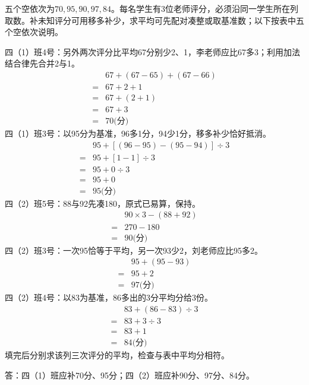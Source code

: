 \begin{BookAnswer}
五个空依次为\(70,95,90,97,84\)。每名学生有3位老师评分，必须沿同一学生所在列取数。补未知评分可用移多补少，求平均可先配对凑整或取基准数；以下按表中五个空依次说明。\par 四（1）班4号：另外两次评分比平均67分别少2、1，李老师应比67多3；利用加法结合律先合并2与1。\[\begin{aligned}&67+(67-65)+(67-66)\\={}&67+2+1\\={}&67+(2+1)\\={}&67+3\\={}&70\text{(分)}\end{aligned}\]四（1）班3号：以95分为基准，96多1分，94少1分，移多补少恰好抵消。\[\begin{aligned}&95+[(96-95)-(95-94)]\div3\\={}&95+[1-1]\div3\\={}&95+0\div3\\={}&95+0\\={}&95\text{(分)}\end{aligned}\]四（2）班5号：88与92先凑180，原式已易算，保持。\[\begin{aligned}&90\times3-(88+92)\\={}&270-180\\={}&90\text{(分)}\end{aligned}\]四（2）班3号：一次95恰等于平均，另一次93少2，刘老师应比95多2。\[\begin{aligned}&95+(95-93)\\={}&95+2\\={}&97\text{(分)}\end{aligned}\]四（2）班4号：以83为基准，86多出的3分平均分给3份。\[\begin{aligned}&83+(86-83)\div3\\={}&83+3\div3\\={}&83+1\\={}&84\text{(分)}\end{aligned}\]填完后分别求该列三次评分的平均，检查与表中平均分相符。\par 答：四（1）班应补70分、95分；四（2）班应补90分、97分、84分。
\end{BookAnswer}

